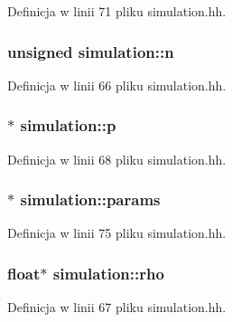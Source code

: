 Definicja w linii 71 pliku simulation.\-hh.

\hypertarget{classsimulation_a22eb97765a5c60adf3d995f7a110da70}{
\subsubsection[{n}]{\setlength{\rightskip}{0pt plus 5cm}unsigned simulation\-::n\hspace{0.3cm}{\ttfamily [private]}}}\label{classsimulation_a22eb97765a5c60adf3d995f7a110da70}


Definicja w linii 66 pliku simulation.\-hh.

\hypertarget{classsimulation_a5412fd01febe99f12ae38e30eb692ff0}{
\subsubsection[{p}]{$\ast$ simulation\-::p\hspace{0.3cm}{\ttfamily [private]}}}\label{classsimulation_a5412fd01febe99f12ae38e30eb692ff0}


Definicja w linii 68 pliku simulation.\-hh.

\hypertarget{classsimulation_a861b82cc3c0e7e58abfba464a133dae3}{
\subsubsection[{params}]{$\ast$ simulation\-::params}}\label{classsimulation_a861b82cc3c0e7e58abfba464a133dae3}


Definicja w linii 75 pliku simulation.\-hh.

\hypertarget{classsimulation_a44081d4edd92e17a3e1067b976031a00}{
\subsubsection[{rho}]{\setlength{\rightskip}{0pt plus 5cm}float$\ast$ simulation\-::rho\hspace{0.3cm}{\ttfamily [private]}}}\label{classsimulation_a44081d4edd92e17a3e1067b976031a00}


Definicja w linii 67 pliku simulation.\-hh.

